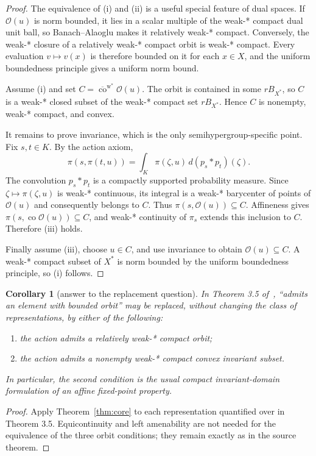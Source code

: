 \documentclass[10pt]{article}
\newtheorem{corollary}[theorem]{Corollary}
\newcommand{\wstar}{\mathrm{w}^*}
\newcommand{\Orb}{\mathcal O}
\begin{document}
\begin{proof}
The equivalence of (i) and (ii) is a useful special feature of dual spaces.
If $\Orb(u)$ is norm bounded, it lies in a scalar multiple of the weak-* compact
dual unit ball, so Banach--Alaoglu makes it relatively weak-* compact.
Conversely, the weak-* closure of a relatively weak-* compact orbit is weak-*
compact.  Every evaluation $v\mapsto v(x)$ is therefore bounded on it for each
$x\in X$, and the uniform boundedness principle gives a uniform norm bound.

Assume (i) and set
$C=\overline{\operatorname{co}}^{\wstar}\Orb(u)$.  The orbit is contained in
some $rB_{X^*}$, so $C$ is a weak-* closed subset of the weak-* compact set
$rB_{X^*}$.  Hence $C$ is nonempty, weak-* compact, and convex.

It remains to prove invariance, which is the only semihypergroup-specific
point.  Fix $s,t\in K$.  By the action axiom,
\[
 \pi(s,\pi(t,u))
   =\int_K \pi(\zeta,u)\,d(p_s*p_t)(\zeta).
\]
The convolution $p_s*p_t$ is a compactly supported probability measure.
Since $\zeta\mapsto\pi(\zeta,u)$ is weak-* continuous, its integral is a
weak-* barycenter of points of $\Orb(u)$ and consequently belongs to $C$.
Thus $\pi(s,\Orb(u))\subseteq C$.  Affineness gives
$\pi(s,\operatorname{co}\Orb(u))\subseteq C$, and weak-* continuity of
$\pi_s$ extends this inclusion to $C$.  Therefore (iii) holds.

Finally assume (iii), choose $u\in C$, and use invariance to obtain
$\Orb(u)\subseteq C$.  A weak-* compact subset of $X^*$ is norm bounded by
the uniform boundedness principle, so (i) follows.
\end{proof}

\begin{corollary}[answer to the replacement question]\label{cor:answer}
In Theorem 3.5 of~\cite{Bandyopadhyay2024}, ``admits an element with bounded
orbit'' may be replaced, without changing the class of representations, by
either of the following:
\begin{enumerate}
\item the action admits a relatively weak-* compact orbit;
\item the action admits a nonempty weak-* compact convex invariant subset.
\end{enumerate}
In particular, the second condition is the usual compact invariant-domain
formulation of an affine fixed-point property.
\end{corollary}

\begin{proof}
Apply Theorem~\ref{thm:core} to each representation quantified over in
Theorem 3.5.  Equicontinuity and left amenability are not needed for the
equivalence of the three orbit conditions; they remain exactly as in the
source theorem.
\end{proof}
\end{document}
